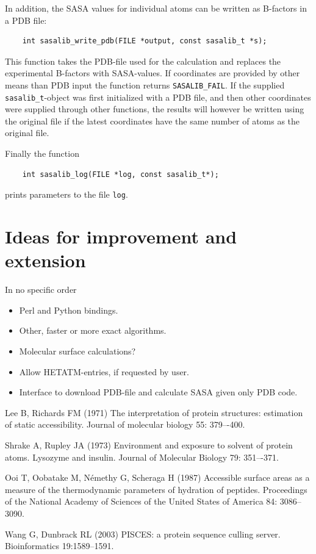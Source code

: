 \documentclass[a4paper,11pt]{article}
\begin{document}
In addition, the SASA values for individual atoms can be written as
B-factors in a PDB file:
\begin{verbatim}
    int sasalib_write_pdb(FILE *output, const sasalib_t *s);
\end{verbatim}
This function takes the PDB-file used for the calculation and replaces
the experimental B-factors with SASA-values. If coordinates are
provided by other means than PDB input the function returns
\verb|SASALIB_FAIL|. If the supplied \verb|sasalib_t|-object was first
initialized with a PDB file, and then other coordinates were supplied
through other functions, the results will however be written using the
original file if the latest coordinates have the same number of atoms
as the original file.

Finally the function
\begin{verbatim}
    int sasalib_log(FILE *log, const sasalib_t*);
\end{verbatim}
prints parameters to the file \verb|log|.

\section{Ideas for improvement and extension}

In no specific order
\begin{itemize}
\item Perl and Python bindings.
\item Other, faster or more exact algorithms.
\item Molecular surface calculations?
\item Allow HETATM-entries, if requested by user.
\item Interface to download PDB-file and calculate SASA given only PDB
  code.
\end{itemize}

\begin{thebibliography}{50}

  Lee B, Richards FM (1971) The interpretation of protein
  structures: estimation of static accessibility. Journal of molecular
  biology 55: 379–-400.

  Shrake A, Rupley JA (1973) Environment and exposure to
  solvent of protein atoms. Lysozyme and insulin. Journal of Molecular
  Biology 79: 351–-371.

  Ooi T, Oobatake M, Némethy G, Scheraga H (1987)
  Accessible surface areas as a measure of the thermodynamic
  parameters of hydration of peptides. Proceedings of the National
  Academy of Sciences of the United States of America 84: 3086–3090.

  Wang G, Dunbrack RL (2003) PISCES: a protein sequence culling server. 
  Bioinformatics 19:1589--1591.

\end{thebibliography}
\end{document}
